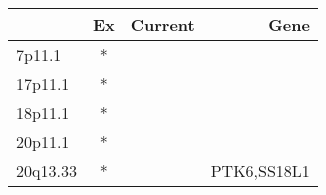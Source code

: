 \begin{tabular}{lccr}
\toprule
{} & Ex & Current &         Gene \\
\midrule
7p11.1   &  * &         &              \\
17p11.1  &  * &         &              \\
18p11.1  &  * &         &              \\
20p11.1  &  * &         &              \\
20q13.33 &  * &         &  PTK6,SS18L1 \\
\bottomrule
\end{tabular}

